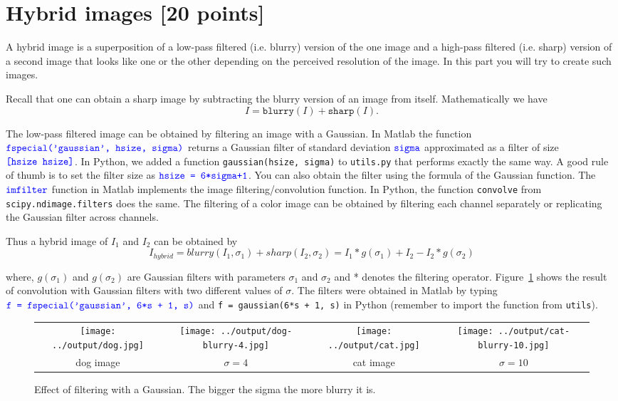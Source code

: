 \documentclass[10pt,letterpaper]{article}
\newcommand{\cmd}[1] {{\color{blue}\texttt{#1}}}
\begin{document}
\section{Hybrid images [20 points]}
A hybrid image is a superposition of a low-pass filtered (i.e. blurry) version of the one image and a high-pass filtered (i.e. sharp) version of a second image that looks like one or the other depending on the perceived resolution of the image. In this part you will try to create such images.


Recall that one can obtain a sharp image by subtracting the blurry version of an image from itself. Mathematically we have
\[
	I = \texttt{blurry}(I) + \texttt{sharp}(I).
\]

The low-pass filtered image can be obtained by filtering an image with a Gaussian. In Matlab the function $\cmd{fspecial('gaussian', hsize, sigma)}$ returns a Gaussian filter of standard deviation $\cmd{sigma}$ approximated as a filter of size 
$\cmd{[hsize hsize]}$.
In Python, we added a function \cmd{gaussian(hsize, sigma)} to \cmd{utils.py} that performs exactly the same way. 
A good rule of thumb is to set the filter size as $\cmd{hsize = 6*sigma+1}$. 
You can also obtain the filter using the formula of the Gaussian function.
The $\cmd{imfilter}$ function in Matlab implements the image filtering/convolution function. 
In Python, the function \cmd{convolve} from \cmd{scipy.ndimage.filters} does the same. 
The filtering of a color image can be obtained by filtering each channel separately or replicating the Gaussian filter across channels.


Thus a hybrid image of $I_1$ and $I_2$ can be obtained by
\begin{equation}\label{eq:hybrid}
	I_{hybrid} = blurry(I_1, \sigma_1) + sharp(I_2, \sigma_2) = I_1 * g(\sigma_1) + I_2 - I_2*g(\sigma_2)
\end{equation}

where, $g(\sigma_1)$ and $g(\sigma_2)$ are Gaussian filters with parameters $\sigma_1$ and $\sigma_2$ and * denotes the filtering operator. Figure~\ref{fig:blur} shows the result of convolution with Gaussian filters with two different values of $\sigma$. 
The filters were obtained in Matlab by typing $\cmd{f = fspecial('gaussian', 6*s + 1, s)}$ and \cmd{f = gaussian(6*s + 1, s)} in Python (remember to import the function from \cmd{utils}).


\begin{figure}
\begin{tabular}{cccc}
\texttt{[image: ../output/dog.jpg]} &
\texttt{[image: ../output/dog-blurry-4.jpg]} & 
\texttt{[image: ../output/cat.jpg]} &
\texttt{[image: ../output/cat-blurry-10.jpg]}\\
dog image & $\sigma=4$ & cat image & $\sigma=10$ \\
\end{tabular}
\caption{\label{fig:blur} Effect of filtering with a Gaussian. The bigger the sigma the more blurry it is.}
\end{figure}
\end{document}
